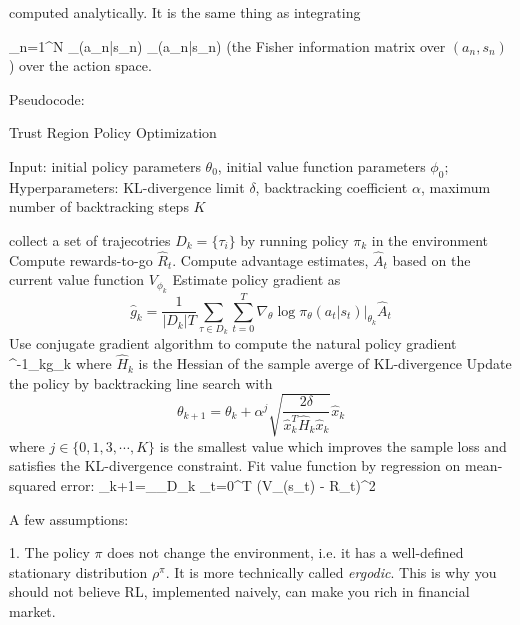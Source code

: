 \documentclass{article}
\let\[\relax \let\]\relax %
\DeclareRobustCommand{\[}{\begin{equation}}
\DeclareRobustCommand{\]}{\end{equation}}
\begin{document}
computed analytically. It is the same thing as integrating

\[
\sum_{n=1}^N 
\log \pi_{\theta}(a_n|s_n)
\log \pi_{\theta}(a_n|s_n)
\]
(the Fisher information matrix over $(a_n, s_n)$) over the action space. 

Pseudocode:

\begin{algorithm}[H]
\caption{Trust Region Policy Optimization}
\label{alg1}
\end{algorithm}

\begin{algorithmic}[1]
\STATE Input: initial policy parameters $\theta_0$, initial value function
parameters $\phi_0$;
\STATE Hyperparameters: KL-divergence limit $\delta$, backtracking coefficient 
$\alpha$, maximum number of backtracking steps $K$

\STATE collect a set of trajecotries $D_k = \{\tau_i\}$ by running policy
$\pi_k$ in the environment
\STATE Compute rewards-to-go $\hat{R}_t$.
\STATE Compute advantage estimates, $\hat{A}_t$ based on the current value
function $V_{\phi_k}$
\STATE Estimate policy gradient as 
    \begin{equation*}
    \hat{g}_k = \frac{1}{|D_k|T}\sum_{\tau \in D_k} \sum_{t=0}^T 
    \left.\nabla_{\theta} \log\pi_{\theta}(a_t|s_t)\right|_{\theta_k} \hat{A}_t
    \end{equation*}
\STATE Use conjugate gradient algorithm to compute the natural policy gradient
    \[
     \simeq {}^{-1}_k\hat g_k
    \]
where $\hat H_k$ is the Hessian of the sample averge of KL-divergence
\STATE Update the policy by backtracking line search with 
    \begin{equation*}
    \theta_{k+1} = \theta_k + \alpha^j \sqrt{
    \frac{2\delta}{\hat x_k^T\hat H_k\hat x_k}}\hat x_k
    \end{equation*}
where $j \in \{0,1,3,\cdots, K\}$ is the smallest value which improves 
the sample loss and satisfies the KL-divergence constraint. 
\STATE Fit value function by regression on mean-squared error:
    \[
    \phi_{k+1}=\argmin_{\phi}\sum_{\tau \in D_k}
    \sum_{t=0}^T (V_{\phi}(s_t) - \hat R_t)^2
    \]
\ENDFOR
        
\end{algorithmic}


A few assumptions:

1. The policy $\pi$ does not change the environment, i.e. it has a 
well-defined stationary distribution $\rho^{\pi}$. It is more technically
called \emph{ergodic}. This is why you should not believe RL, implemented
naively, can make you rich in financial market. 
\end{document}
